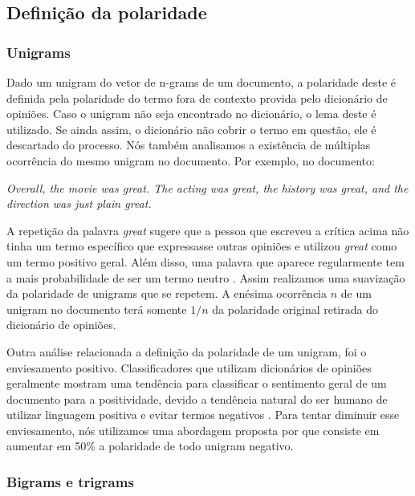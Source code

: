 \subsection{Definição da polaridade}

\subsubsection{Unigrams}

Dado um unigram do vetor de n-grams de um documento, a polaridade deste é definida pela polaridade do termo fora de contexto provida pelo dicionário de opiniões. Caso o unigram não seja encontrado no dicionário, o lema  deste é utilizado. Se ainda assim, o dicionário não cobrir o termo em questão, ele é descartado do processo.
Nós também analisamos a existência de múltiplas ocorrência do mesmo unigram no documento. Por exemplo, no documento:

\textit{Overall, the movie was great. The acting was great, the history was great, and the direction was just plain great.}

A repetição da palavra \textit{great} sugere que a pessoa que escreveu a crítica acima não tinha um termo específico que expressasse outras opiniões e utilizou \textit{great} como um termo positivo geral. Além disso, uma palavra que aparece regularmente tem a mais probabilidade de ser um termo neutro \cite{taboada2011lexicon}. Assim realizamos uma suavização da polaridade de unigrams que se repetem. A enésima ocorrência $n$ de um unigram no documento terá somente $1/n$ da polaridade original retirada do dicionário de opiniões.

Outra análise relacionada a definição da polaridade de um unigram, foi o enviesamento positivo. Classificadores que utilizam dicionários de opiniões geralmente mostram uma tendência para classificar o sentimento geral de um documento para a positividade, devido a tendência natural do ser humano de utilizar linguagem positiva e evitar termos negativos \cite{boucher1969pollyanna, kennedy2006sentiment}. Para tentar diminuir esse enviesamento, nós utilizamos uma abordagem proposta por  que consiste em aumentar em 50\% a polaridade de todo unigram negativo. 

\subsubsection{Bigrams e trigrams}

